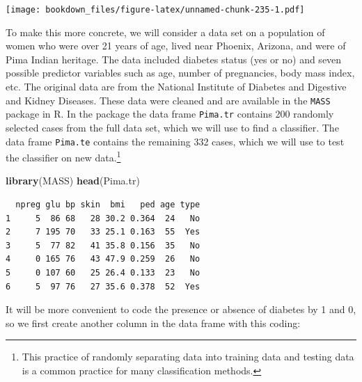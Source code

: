 \documentclass[
]{krantz}
\makeatletter
\newenvironment{Shaded}{\begin{snugshade}}{\end{snugshade}}
\newcommand{\DecValTok}[1]{\textcolor[rgb]{0.06,0.06,0.06}{#1}}
\newcommand{\KeywordTok}[1]{\textcolor[rgb]{0.27,0.27,0.27}{\textbf{#1}}}
\newcommand{\NormalTok}[1]{#1}
\newcommand{\OperatorTok}[1]{\textcolor[rgb]{0.43,0.43,0.43}{\textbf{#1}}}
\newcommand{\StringTok}[1]{\textcolor[rgb]{0.5,0.5,0.5}{#1}}
\newenvironment{kframe}{%
\medskip{}
\setlength{\fboxsep}{.8em}
 \def\at@end@of@kframe{}%
 \ifinner\ifhmode%
  \def\at@end@of@kframe{\end{minipage}}%
  \begin{minipage}{\columnwidth}%
 \fi\fi%
 \def\FrameCommand##1{\hskip\@totalleftmargin \hskip-\fboxsep
 \colorbox{shadecolor}{##1}\hskip-\fboxsep
     \hskip-\linewidth \hskip-\@totalleftmargin \hskip\columnwidth}%
 \MakeFramed {\advance\hsize-\width
   \@totalleftmargin\z@ \linewidth\hsize
   \@setminipage}}%
 {\par\unskip\endMakeFramed%
 \at@end@of@kframe}
\renewenvironment{Shaded}{\begin{kframe}}{\end{kframe}}
\makeatother
\begin{document}
\texttt{[image: bookdown\_files/figure-latex/unnamed-chunk-235-1.pdf]}

To make this more concrete, we will consider a data set on a population of women who were over 21 years of age, lived near Phoenix, Arizona, and were of Pima Indian heritage. The data included diabetes status (yes or no) and seven possible predictor variables such as age, number of pregnancies, body mass index, etc. The original data are from the National Institute of Diabetes and Digestive and Kidney Diseases. These data were cleaned and are available in the \texttt{MASS} package in R. In the package the data frame \texttt{Pima.tr} contains 200 randomly selected cases from the full data set, which we will use to find a classifier. The data frame \texttt{Pima.te} contains the remaining 332 cases, which we will use to test the classifier on new data.\footnote{This practice of randomly separating data into training data and testing data is a common practice for many classification methods.}

\begin{Shaded}
\begin{Highlighting}[]
\KeywordTok{library}\NormalTok{(MASS)}
\KeywordTok{head}\NormalTok{(Pima.tr)}
\end{Highlighting}
\end{Shaded}

\begin{verbatim}
  npreg glu bp skin  bmi   ped age type
1     5  86 68   28 30.2 0.364  24   No
2     7 195 70   33 25.1 0.163  55  Yes
3     5  77 82   41 35.8 0.156  35   No
4     0 165 76   43 47.9 0.259  26   No
5     0 107 60   25 26.4 0.133  23   No
6     5  97 76   27 35.6 0.378  52  Yes
\end{verbatim}

It will be more convenient to code the presence or absence of diabetes by 1 and 0, so we first create another column in the data frame with this coding:

\begin{Shaded}
\end{Shaded}
\end{document}
